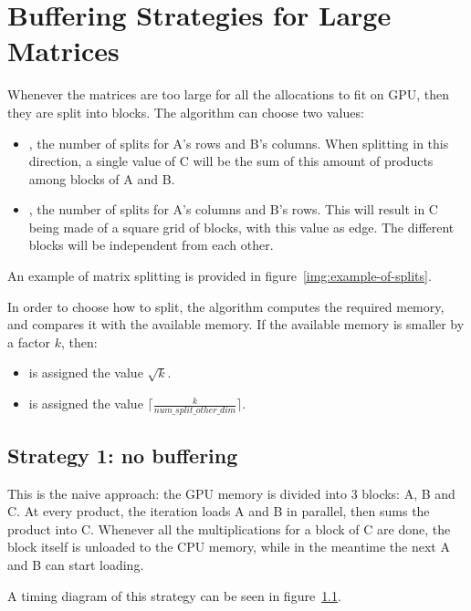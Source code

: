 \section{Buffering Strategies for Large Matrices}
\label{sec:strategies}


Whenever the matrices are too large for all the allocations to fit on GPU, then they are split into blocks.
The algorithm can choose two values:
\begin{itemize}
	\item {}, the number of splits for A's rows and B's columns. When splitting in this direction, a single value of C will be the sum of this amount of products among blocks of A and B.
	\item{}, the number of splits for A's columns and B's rows. This will result in C being made of a square grid of blocks, with this value as edge. The different blocks will be independent from each other.
\end{itemize}

An example of matrix splitting is provided in figure~\ref{img:example-of-splits}.


In order to choose how to split, the algorithm computes the required memory, and compares it with the available memory.
If the available memory is smaller by a factor $k$, then:
\begin{itemize}
	\itemsep 0em
	\item {} is assigned the value $\sqrt{k}$.
	\item{} is assigned the value $\lceil \frac{k}{num\_split\_other\_dim} \rceil$.
\end{itemize}

\subsection{Strategy 1: no buffering}

This is the naive approach: the GPU memory is divided into 3 blocks: A, B and C.
At every product, the iteration loads A and B in parallel, then sums the product into C.
Whenever all the multiplications for a block of C are done, the block itself is unloaded to the CPU memory, while in the meantime the next A and B can start loading.

A timing diagram of this strategy can be seen in figure~\ref{}.

